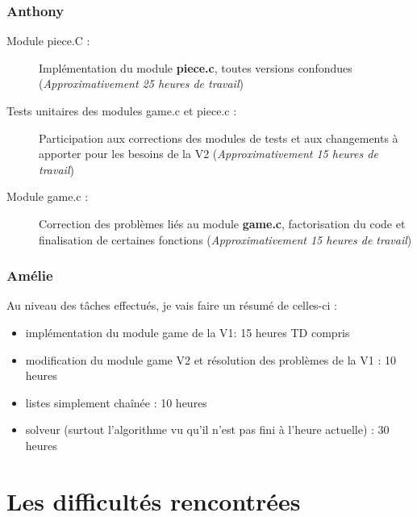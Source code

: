 \documentclass{report}
\begin{document}
\subsection*{Anthony}
\begin{description}
\item [Module piece.C : ] Implémentation du module \textbf{piece.c}, toutes versions confondues (\textit{Approximativement 25 heures de travail})
\item [Tests unitaires des modules game.c et piece.c : ] Participation aux corrections des modules de tests et aux changements à apporter pour les besoins de la V2 (\textit{Approximativement 15 heures de travail})
\item [Module game.c : ] Correction des problèmes liés au module \textbf{game.c}, factorisation du code et finalisation de certaines fonctions (\textit{Approximativement 15 heures de travail})
\end{description}

\subsection*{Amélie}
Au niveau des tâches effectués, je vais faire un résumé de celles-ci :
\begin{itemize}
\item implémentation du module game de la V1:  15 heures TD compris
\item modification du module game V2 et résolution des problèmes de la V1 : 10 heures
\item listes simplement chaînée : 10 heures
\item solveur (surtout l'algorithme vu qu'il n'est pas fini à l'heure actuelle) : 30 heures
\end{itemize}


\chapter{Les difficultés rencontrées}
\setcounter{section}{0}
\end{document}
